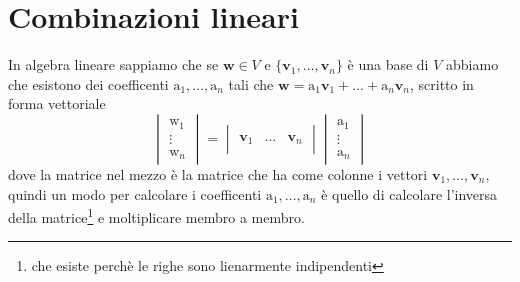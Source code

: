 \documentclass[11pt,a4paper]{report}
\newcommand{\vettore}[1]{\mathbf{#1}}
\newcommand{\vettorec}[1]{\textrm{#1}}
\theoremstyle{definition}
\theoremstyle{plain}
\theoremstyle{plain}
\begin{document}
		\section{Combinazioni lineari}
		\label{sec:comb_lin}
			In algebra lineare sappiamo che se $\vettore w\in V$ e $\{\vettore v_1,\dots,\vettore v_n\}$ è una base di $V$ abbiamo che esistono dei coefficenti $\vettorec a_1,\dots,\vettorec a_n$ tali che $\vettore w=\vettorec a_1 \vettore v_1+\dots +\vettorec a_n \vettore v_n$, scritto in forma vettoriale
			\begin{equation}
				\begin{vmatrix}
					\vettorec w_1\\
					\vdots\\
					\vettorec w_n
				\end{vmatrix}
				=
				\begin{vmatrix}
					& & \\
					\vettore v_1 & \dots & \vettore v_n\\
					& & 
				\end{vmatrix}
				\begin{vmatrix}
					\vettorec a_1\\
					\vdots\\
					\vettorec a_n
				\end{vmatrix}
			\end{equation}
			dove la matrice nel mezzo è la matrice che ha come colonne i vettori $\vettore v_1,\dots,\vettore v_n$, quindi un modo per calcolare i coefficenti $\vettorec a_1,\dots,\vettorec a_n$ è quello di calcolare l'inversa della matrice\footnote{che esiste perchè le righe sono lienarmente indipendenti} e moltiplicare membro a membro.\newline
\end{document}
